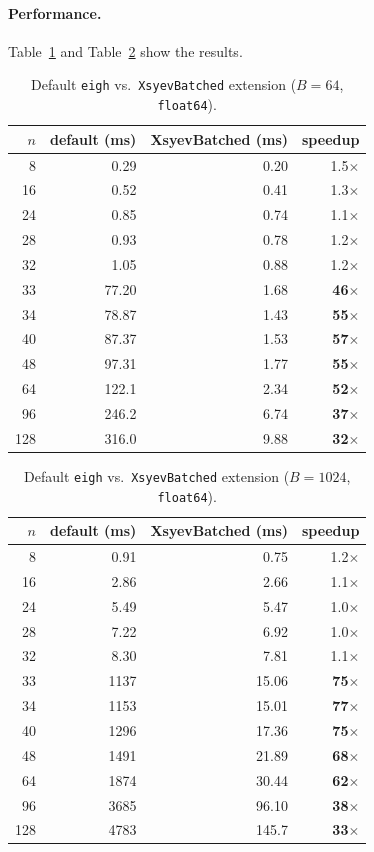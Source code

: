 \documentclass[10pt, letterpaper]{article}
\begin{document}
\paragraph{Performance.}
Table~\ref{tab:fix64} and Table~\ref{tab:fix1024} show the results.

\begin{table}[h]
\centering
\caption{Default \texttt{eigh} vs.\ \texttt{XsyevBatched} extension
($B = 64$, \texttt{float64}).}
\label{tab:fix64}
\begin{tabular}{r rrr}
\toprule
$n$ & default (ms) & XsyevBatched (ms) & speedup \\
\midrule
  8  & 0.29  & 0.20  & 1.5$\times$ \\
 16  & 0.52  & 0.41  & 1.3$\times$ \\
 24  & 0.85  & 0.74  & 1.1$\times$ \\
 28  & 0.93  & 0.78  & 1.2$\times$ \\
 32  & 1.05  & 0.88  & 1.2$\times$ \\
\midrule
 33  & 77.20 & 1.68  & \textbf{46$\times$} \\
 34  & 78.87 & 1.43  & \textbf{55$\times$} \\
 40  & 87.37 & 1.53  & \textbf{57$\times$} \\
 48  & 97.31 & 1.77  & \textbf{55$\times$} \\
 64  & 122.1 & 2.34  & \textbf{52$\times$} \\
 96  & 246.2 & 6.74  & \textbf{37$\times$} \\
128  & 316.0 & 9.88  & \textbf{32$\times$} \\
\bottomrule
\end{tabular}
\end{table}

\begin{table}[h]
\centering
\caption{Default \texttt{eigh} vs.\ \texttt{XsyevBatched} extension
($B = 1024$, \texttt{float64}).}
\label{tab:fix1024}
\begin{tabular}{r rrr}
\toprule
$n$ & default (ms) & XsyevBatched (ms) & speedup \\
\midrule
  8  & 0.91  & 0.75  & 1.2$\times$ \\
 16  & 2.86  & 2.66  & 1.1$\times$ \\
 24  & 5.49  & 5.47  & 1.0$\times$ \\
 28  & 7.22  & 6.92  & 1.0$\times$ \\
 32  & 8.30  & 7.81  & 1.1$\times$ \\
\midrule
 33  & 1137  & 15.06 & \textbf{75$\times$} \\
 34  & 1153  & 15.01 & \textbf{77$\times$} \\
 40  & 1296  & 17.36 & \textbf{75$\times$} \\
 48  & 1491  & 21.89 & \textbf{68$\times$} \\
 64  & 1874  & 30.44 & \textbf{62$\times$} \\
 96  & 3685  & 96.10 & \textbf{38$\times$} \\
128  & 4783  & 145.7 & \textbf{33$\times$} \\
\bottomrule
\end{tabular}
\end{table}
\end{document}
